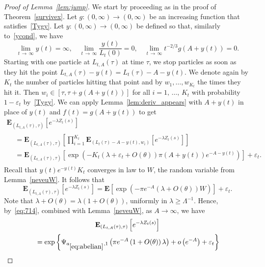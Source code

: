 \documentclass[10pt]{amsart}
\theoremstyle{definition}\newtheorem{defi}[theo]{Definition}\newtheorem{rema}[theo]{Remark}\newtheorem{exam}[theo]{Example}\newtheorem{exem}[theo]{Example}\newtheorem{nota}[theo]{Notation}
\newcommand*\eps{\varepsilon}
\newcommand*\E{\mathbf{E}}
\newcommand{\1} {\mathds{1}}
\renewcommand*\to{\rightarrow}
\begin{document}
\begin{proof}[Proof of Lemma~\ref{lem:jump}]
We start by proceeding as in the proof of Theorem~\ref{survivex}. Let $g: (0, \infty) \rightarrow (0, \infty)$ be an increasing function that satisfies~\eqref{Tygy}. Let $y: (0, \infty) \rightarrow (0, \infty)$ be defined so that, similarly to~\eqref{ycond}, we have
\[
\lim_{t\,\rightarrow\,\infty} y(t) = \infty, \quad \lim_{t\,\rightarrow\,\infty} \frac{y(t)}{L_t(0)} = 0, \quad \lim_{t\,\rightarrow\,\infty} t^{-2/3} g(A + y(t)) = 0.
\]
Starting with one particle at $L_{t,A}(\tau)$ at time $\tau$, we stop particles as soon as they hit the point $L_{t,A}(\tau)-y(t) = L_t(\tau) - A - y(t)$. We denote again by $K_t$ the number of particles hitting that point and by $w_1,\ldots,w_{K_t}$ the times they hit it. Then $w_i \in [\tau,\tau+g(A + y(t))]$ for all $i=1,\,\ldots,\,K_t$ with probability $1-\eps_t$ by~\eqref{Tygy}. We can apply Lemma~\ref{lem:deriv_appears} with $A + y(t)$ in place of $y(t)$ and $f(t) = g(A + y(t))$ to get
\begin{multline}
\E_{\left(L_{t,A}(\tau),\tau\right)}\left[e^{-\lambda Z_t(s)}\right]\\
\begin{aligned}
&= \E_{\left(L_{t,A}(\tau),\tau\right)}\left[\prod_{i=1}^{K_t} \E_{\left(L_t(\tau) - A - y(t),w_i\right)}\left[e^{-\lambda Z_t(s)}\right]\right]\\
&= \E_{\left(L_{t,A}(\tau),\tau\right)}\left[\exp\left(-K_t \left(\lambda +\eps_t+O(\theta)\right) \pi \left(A+y(t)\right)e^{-A-y(t)}\right)\right]+ \eps_t.
\end{aligned}
\end{multline}
Recall that $y(t)e^{-y(t)} K_t$ converges in law to $W$, the random variable from Lemma~\ref{neveuW}. It follows that
\begin{equation}\label{eq:714}
\E_{\left(L_{t,A}(\tau),\tau\right)}\left[e^{-\lambda Z_t(s)}\right] =
\E\left[\exp\left(-\pi e^{-A}\left(\lambda +O(\theta)\right) W\right)\right] + \eps_t.
\end{equation}
Note that $\lambda + O(\theta) =\lambda(1+O(\theta))$, uniformly in $\lambda\ge \Lambda^{-1}$. Hence, by~\eqref{eq:714}, combined with Lemma~\ref{neveuW}, as $A\to\infty$, we have
\begin{multline}\label{eq:715}
\E_{\left(L_{t,A}(\tau),\tau\right)}\left[e^{-\lambda Z_t(s)}\right]\\
\begin{aligned}
 &= \exp\left\{\Psi_{a_{\eqref{eq:abelian}},1}\left(\pi e^{-A}\left(1 +O(\theta)\right)\lambda\right)+o\left(e^{-A}\right) + \eps_t\right\}\\

\end{aligned}
\end{multline}
\end{proof}
\end{document}
